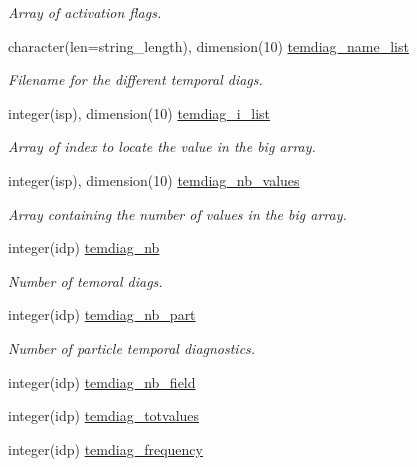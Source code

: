 \begin{DoxyCompactItemize}
\begin{DoxyCompactList}\small\item\em Array of activation flags. \end{DoxyCompactList}\item 
character(len=string\+\_\+length), dimension(10) \hyperlink{namespaceoutput__data_a891f4f8be197dbbfe91c01ee5260b4c2}{temdiag\+\_\+name\+\_\+list}
\begin{DoxyCompactList}\small\item\em Filename for the different temporal diags. \end{DoxyCompactList}\item 
integer(isp), dimension(10) \hyperlink{namespaceoutput__data_a272ff12d370f1ddd453ed84e0aea955b}{temdiag\+\_\+i\+\_\+list}
\begin{DoxyCompactList}\small\item\em Array of index to locate the value in the big array. \end{DoxyCompactList}\item 
integer(isp), dimension(10) \hyperlink{namespaceoutput__data_a2c62698838d0295802c6b2a6637c3827}{temdiag\+\_\+nb\+\_\+values}
\begin{DoxyCompactList}\small\item\em Array containing the number of values in the big array. \end{DoxyCompactList}\item 
integer(idp) \hyperlink{namespaceoutput__data_a996655a7d030216dcce6367a59b22ae8}{temdiag\+\_\+nb}
\begin{DoxyCompactList}\small\item\em Number of temoral diags. \end{DoxyCompactList}\item 
integer(idp) \hyperlink{namespaceoutput__data_a950d70a052698f77988f39da1fddf632}{temdiag\+\_\+nb\+\_\+part}
\begin{DoxyCompactList}\small\item\em Number of particle temporal diagnostics. \end{DoxyCompactList}\item 
integer(idp) \hyperlink{namespaceoutput__data_a6e3150da1e4314b418b4f40c56737551}{temdiag\+\_\+nb\+\_\+field}
\item 
integer(idp) \hyperlink{namespaceoutput__data_a85fe1c4047057dc4292320e82cae2cda}{temdiag\+\_\+totvalues}
\item 
integer(idp) \hyperlink{namespaceoutput__data_ab55f479db67f7b4af32d0a55e2ba6620}{temdiag\+\_\+frequency}

\end{DoxyCompactItemize}
